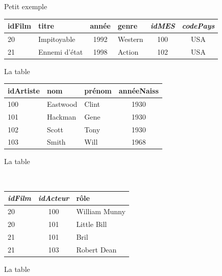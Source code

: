 \begin{frame}{Petit exemple}


\begin{small}
\begin{center}
\begin{tabular}{l|l|c|l|c|c}
\textbf{idFilm} & titre & année  & genre & \textit{idMES} & \textit{codePays}\\
\hline
20 & Impitoyable & 1992 & Western & 100 & USA \\
21 & Ennemi d'état & 1998 & Action & 102 & USA\\
\hline
\end{tabular}

\centerline{La table }
\end{center}
\begin{center}
\begin{minipage}[b]{6cm}
\begin{tabular}{l|l|l|c}
\textbf{idArtiste} &  nom & prénom &  annéeNaiss \\
\hline
100 & Eastwood & Clint  & 1930 \\
101 & Hackman & Gene  & 1930 \\
102 & Scott & Tony  & 1930 \\
103 & Smith  & Will  & 1968 \\
\hline
\end{tabular}
\centerline{La table }
\end{minipage} \hspace*{2cm} \
\begin{minipage}[b]{5cm}
\begin{tabular}{l|c|l}
\textbf{\textit{idFilm}} & \textbf{\textit{idActeur}}  & rôle \\
\hline
20  & 100  & William Munny\\
20 & 101  & Little Bill\\
21 & 101  & Bril\\
21 & 103  & Robert Dean\\
\hline
\end{tabular}

\centerline{La table }
\end{minipage}
\end{center}
\end{small}
\end{frame}


